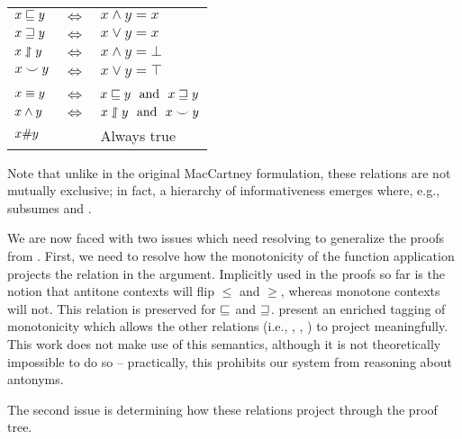 \begin{center}
\begin{tabular}{lcl}
  $x \sqsubseteq y$ & $\Leftrightarrow$ & $x \land y = x$ \\
  $x \sqsupseteq y$ & $\Leftrightarrow$ & $x \lor y = x$ \\
  $x \downharpoonleft\hspace{-0.30em}\upharpoonright y$ & $\Leftrightarrow$ & $x \land y = \bot$ \\
  $x \smile y$ & $\Leftrightarrow$ & $x \lor y = \top$ \\
  \vspace{-0.5em} & & \\
  $x \equiv y$ & $\Leftrightarrow$ & $x \sqsubseteq y~~\textrm{and}~~x \sqsupseteq y$ \\
  $x \wedge y$ & $\Leftrightarrow$ & $x \downharpoonleft\hspace{-0.30em}\upharpoonright y~~\textrm{and}~~x \smile y$ \\
  $x \# y$ & & Always true
\end{tabular}
\end{center}

Note that unlike in the original MacCartney formulation, these relations
  are not mutually exclusive; in fact, a hierarchy of informativeness
  emerges where, e.g., \negate subsumes \alternate and \cover.

We are now faced with two issues which need resolving to generalize
  the proofs from .
First, we need to resolve how the monotonicity of the function application
  projects the relation in the argument.
Implicitly used in the proofs so far is the notion that antitone contexts
  will flip $\leq$ and $\geq$, whereas monotone contexts will not.
This relation is preserved for $\sqsubseteq$ and $\sqsupseteq$.
 present an enriched tagging of 
  monotonicity which allows the other relations (i.e.,
  \negate, \alternate, \cover) to project meaningfully.
This work does not make use of this semantics, although it is not
  theoretically impossible to do so -- practically, this prohibits
  our system from reasoning about antonyms.

The second issue is determining how these relations project through
  the proof tree.

